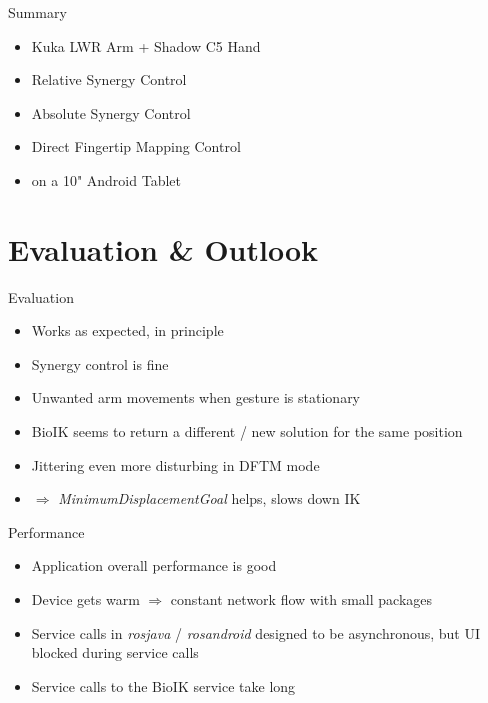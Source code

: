 \documentclass[t]{beamer}
\begin{document}
\begin{frame}{Summary}
\begin{itemize}
	\item Kuka LWR Arm + Shadow C5 Hand
	\item Relative Synergy Control
	\item Absolute Synergy Control
	\item Direct Fingertip Mapping Control
	\item on a 10" Android Tablet
\end{itemize}
\end{frame}

\section{Evaluation \& Outlook}

\begin{frame}{Evaluation}
\begin{itemize}
	\item Works as expected, in principle
	\item Synergy control is fine
	\item Unwanted arm movements when gesture is stationary
	\item BioIK seems to return a different / new solution for the same position
	\item Jittering even more disturbing in DFTM mode
	\item $\Rightarrow$ \textit{MinimumDisplacementGoal} helps, slows down IK
\end{itemize}
\end{frame}

\begin{frame}{Performance}
\begin{itemize}
	\item Application overall performance is good
	\item Device gets warm $\Rightarrow$ constant network flow with small packages
	\item Service calls in \textit{rosjava} / \textit{rosandroid} designed to be asynchronous, but UI blocked during service calls
	\item Service calls to the BioIK service take long
\end{itemize}
\end{frame}
\end{document}
